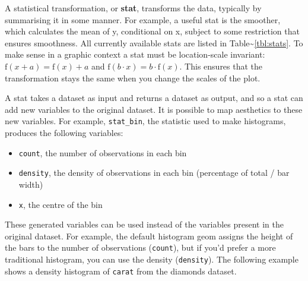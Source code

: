  


A statistical transformation, or \textbf{stat}, transforms the data,
typically by summarising it in some manner. For example, a useful stat
is the smoother, which calculates the mean of y, conditional on x,
subject to some restriction that ensures smoothness. All currently
available stats are listed in Table\textasciitilde{}\ref{tbl:stats}. To
make sense in a graphic context a stat must be location-scale invariant:
$\mbox{f}(x + a) = \mbox{f}(x) + a$ and
$\mbox{f}(b \cdot x) = b \cdot \mbox{f}(x)$. This ensures that the
transformation stays the same when you change the scales of the plot.



A stat takes a dataset as input and returns a dataset as output, and so
a stat can add new variables to the original dataset. It is possible to
map aesthetics to these new variables. For example, \texttt{stat\_bin},
the statistic used to make histograms, produces the following variables:
 

\begin{itemize}
\itemsep1pt\parskip0pt
\item
  \texttt{count}, the number of observations in each bin
\item
  \texttt{density}, the density of observations in each bin (percentage
  of total / bar width)
\item
  \texttt{x}, the centre of the bin
\end{itemize}

These generated variables can be used instead of the variables present
in the original dataset. For example, the default histogram geom assigns
the height of the bars to the number of observations (\texttt{count}),
but if you'd prefer a more traditional histogram, you can use the
density (\texttt{density}). The following example shows a density
histogram of \texttt{carat} from the diamonds dataset.

\begin{Shaded}
\begin{Highlighting}[]
\NormalTok{>}\StringTok{ }\StringTok{ }
\NormalTok{+}\StringTok{   }\NormalTok{(}\NormalTok{(}  \NormalTok{)}
\end{Highlighting}
\end{Shaded}

